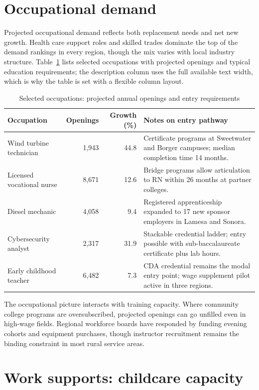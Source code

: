 \documentclass[11pt]{article}
\begin{document}
\section{Occupational demand}\label{sec:occ}

Projected occupational demand reflects both replacement needs and net new
growth. Health care support roles and skilled trades dominate the top of the
demand rankings in every region, though the mix varies with local industry
structure. Table~\ref{tab:occ} lists selected occupations with projected
openings and typical education requirements; the description column uses the
full available text width, which is why the table is set with a flexible
column layout.

\begin{table}[htbp]
\centering
\caption{Selected occupations: projected annual openings and entry requirements}
\label{tab:occ}
\begin{tabularx}{\textwidth}{@{}lrrX@{}}
\toprule
Occupation & Openings & Growth (\%) & Notes on entry pathway \\
\midrule
Wind turbine technician & 1{,}943 & 44.8 & Certificate programs at Sweetwater and Borger campuses; median completion time 14 months. \\
Licensed vocational nurse & 8{,}671 & 12.6 & Bridge programs allow articulation to RN within 26 months at partner colleges. \\
Diesel mechanic & 4{,}058 & 9.4 & Registered apprenticeship expanded to 17 new sponsor employers in Lamesa and Sonora. \\
Cybersecurity analyst & 2{,}317 & 31.9 & Stackable credential ladder; entry possible with sub-baccalaureate certificate plus lab hours. \\
Early childhood teacher & 6{,}482 & 7.3 & CDA credential remains the modal entry point; wage supplement pilot active in three regions. \\
\bottomrule
\end{tabularx}
\end{table}

The occupational picture interacts with training capacity. Where community
college programs are oversubscribed, projected openings can go unfilled even
in high-wage fields. Regional workforce boards have responded by funding
evening cohorts and equipment purchases, though instructor recruitment remains
the binding constraint in most rural service areas.

\section{Work supports: childcare capacity}\label{sec:supports}
\end{document}
